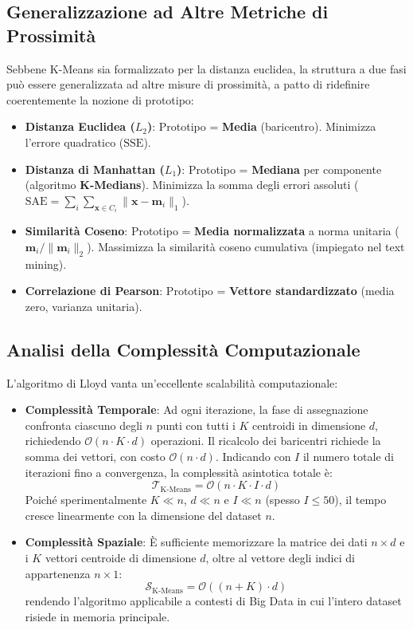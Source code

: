 \subsection{Generalizzazione ad Altre Metriche di Prossimità}

Sebbene K-Means sia formalizzato per la distanza euclidea, la struttura a due fasi può essere generalizzata ad altre misure di prossimità, a patto di ridefinire coerentemente la nozione di prototipo:
\begin{itemize}
    \item \textbf{Distanza Euclidea ($L_2$)}: Prototipo = \textbf{Media} (baricentro). Minimizza l'errore quadratico ($\mathrm{SSE}$).
    \item \textbf{Distanza di Manhattan ($L_1$)}: Prototipo = \textbf{Mediana} per componente (algoritmo \textbf{K-Medians}). Minimizza la somma degli errori assoluti ($\mathrm{SAE} = \sum_{i} \sum_{\mathbf{x} \in C_i} \|\mathbf{x} - \mathbf{m}_i\|_1$).
    \item \textbf{Similarità Coseno}: Prototipo = \textbf{Media normalizzata} a norma unitaria ($\mathbf{m}_i / \|\mathbf{m}_i\|_2$). Massimizza la similarità coseno cumulativa (impiegato nel text mining).
    \item \textbf{Correlazione di Pearson}: Prototipo = \textbf{Vettore standardizzato} (media zero, varianza unitaria).
\end{itemize}

\subsection{Analisi della Complessità Computazionale}

L'algoritmo di Lloyd vanta un'eccellente scalabilità computazionale:
\begin{itemize}
    \item \textbf{Complessità Temporale}: Ad ogni iterazione, la fase di assegnazione confronta ciascuno degli $n$ punti con tutti i $K$ centroidi in dimensione $d$, richiedendo $\mathcal{O}(n \cdot K \cdot d)$ operazioni. Il ricalcolo dei baricentri richiede la somma dei vettori, con costo $\mathcal{O}(n \cdot d)$. Indicando con $I$ il numero totale di iterazioni fino a convergenza, la complessità asintotica totale è:
    \begin{equation}
        \mathcal{T}_{\text{K-Means}} = \mathcal{O}(n \cdot K \cdot I \cdot d)
    \end{equation}
    Poiché sperimentalmente $K \ll n$, $d \ll n$ e $I \ll n$ (spesso $I \le 50$), il tempo cresce linearmente con la dimensione del dataset $n$.
    \item \textbf{Complessità Spaziale}: È sufficiente memorizzare la matrice dei dati $n \times d$ e i $K$ vettori centroide di dimensione $d$, oltre al vettore degli indici di appartenenza $n \times 1$:
    \begin{equation}
        \mathcal{S}_{\text{K-Means}} = \mathcal{O}((n + K) \cdot d)
    \end{equation}
    rendendo l'algoritmo applicabile a contesti di Big Data in cui l'intero dataset risiede in memoria principale.
\end{itemize}

